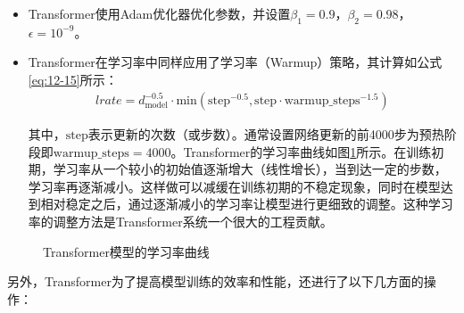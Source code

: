 \begin{itemize}
\vspace{0.5em}
\item	Transformer使用Adam优化器优化参数，并设置$\beta_1=0.9$，$\beta_2=0.98$，$\epsilon=10^{-9}$。
\item Transformer在学习率中同样应用了学习率{\small{}}（Warmup）策略，其计算如公式\eqref{eq:12-15}所示：
\begin{eqnarray}
lrate = d_{\textrm{model}}^{-0.5} \cdot \textrm{min} (\textrm{step}^{-0.5} , \textrm{step} \cdot \textrm{warmup\_steps}^{-1.5})
\label{eq:12-15}
\end{eqnarray}

\vspace{0.5em}
其中，$\textrm{step}$表示更新的次数（或步数）。通常设置网络更新的前4000步为预热阶段即$\textrm{warmup\_steps}=4000$。Transformer的学习率曲线如图\ref{fig:12-17}所示。在训练初期，学习率从一个较小的初始值逐渐增大（线性增长），当到达一定的步数，学习率再逐渐减小。这样做可以减缓在训练初期的不稳定现象，同时在模型达到相对稳定之后，通过逐渐减小的学习率让模型进行更细致的调整。这种学习率的调整方法是Transformer系统一个很大的工程贡献。
\vspace{0.5em}
\end{itemize}

\begin{figure}[htp]
\centering

\caption{Transformer模型的学习率曲线}
\label{fig:12-17}
\end{figure}

\parinterval 另外，Transformer为了提高模型训练的效率和性能，还进行了以下几方面的操作：

